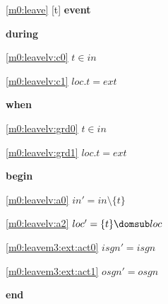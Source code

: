 \noindent \ref{m0:leave} [t] \textbf{event}
\begin{block}
\item \textbf{during}
\begin{block}
\item[ \eqref{m0:leavelv:c0} ]$t \in in $ %
\item[ \eqref{m0:leavelv:c1} ]$loc.t = ext $ %
\end{block}
\item \textbf{when}
\begin{block}
\item[ \eqref{m0:leavelv:grd0} ]$t \in in $ %
\item[ \eqref{m0:leavelv:grd1} ]$loc.t = ext $ %
\end{block}
\item \textbf{begin}
\begin{block}
\item[ \eqref{m0:leavelv:a0} ]$in' = in \setminus \{ t \} $ %
\item[ \eqref{m0:leavelv:a2} ]$loc' = \{ t \} \domsub loc $ %
\item[ \eqref{m0:leavem3:ext:act0} ]$isgn' = isgn$ %
\item[ \eqref{m0:leavem3:ext:act1} ]$osgn' = osgn$ %
\end{block}
\item \textbf{end} \\
\end{block}
